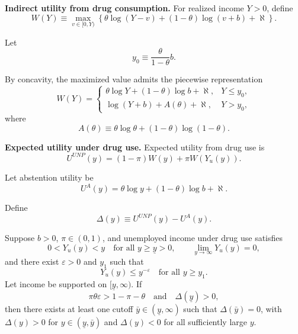 \medskip

\noindent
\textbf{Indirect utility from drug consumption.}
For realized income $Y>0$, define
\[
W(Y)\equiv
\max_{v\in[0,Y)}
\left\{
\theta\log(Y-v)
+
(1-\theta)\log(v+b)
+
\aleph
\right\}.
\]

Let
\[
y_0\equiv \frac{\theta}{1-\theta}b.
\]

By concavity, the maximized value admits the piecewise representation
\[
W(Y)=
\begin{cases}
\theta\log Y+(1-\theta)\log b+\aleph, & Y\le y_0,\\[6pt]
\log(Y+b)+A(\theta)+\aleph, & Y>y_0,
\end{cases}
\]
where
\[
A(\theta)\equiv \theta\log\theta+(1-\theta)\log(1-\theta).
\]

\medskip

\noindent
\textbf{Expected utility under drug use.}
Expected utility from drug use is
\[
U^{UNP}(y)
=
(1-\pi)W(y)
+
\pi W(Y_u(y)).
\]

Let abstention utility be
\[
U^{A}(y)
=
\theta\log y
+
(1-\theta)\log b
+
\aleph.
\]

Define
\[
\Delta(y)\equiv U^{UNP}(y)-U^{A}(y).
\]

\begin{lemma}
\label{lem:nonprop_cutoff}
Suppose $b>0$, $\pi\in(0,1)$, and unemployed income under drug use satisfies
\[
0<Y_u(y)<y \quad \text{for all } y\ge \underline y>0,
\qquad
\lim_{y\to\infty} Y_u(y)=0,
\]
and there exist $\varepsilon>0$ and $y_1$ such that
\[
Y_u(y)\le y^{-\varepsilon}
\quad
\text{for all } y\ge y_1.
\]
Let income be supported on $[\underline y,\infty)$.
If
\[
\pi\theta\varepsilon>1-\pi-\theta
\quad
\text{and}
\quad
\Delta(\underline y)>0,
\]
then there exists at least one cutoff
$\bar y\in(\underline y,\infty)$ such that
$\Delta(\bar y)=0$,
with $\Delta(y)>0$ for $y\in(\underline y,\bar y)$
and $\Delta(y)<0$ for all sufficiently large $y$.
\end{lemma}

